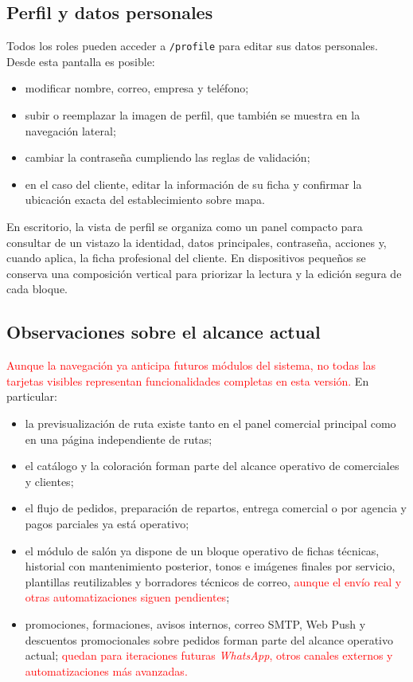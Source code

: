 \subsection{Perfil y datos personales}

Todos los roles pueden acceder a \texttt{/profile} para editar sus datos personales. Desde esta pantalla es posible:

\begin{itemize}
    \item modificar nombre, correo, empresa y teléfono;
    \item subir o reemplazar la imagen de perfil, que también se muestra en la navegación lateral;
    \item cambiar la contraseña cumpliendo las reglas de validación;
    \item en el caso del cliente, editar la información de su ficha y confirmar la ubicación exacta del establecimiento sobre mapa.
\end{itemize}

En escritorio, la vista de perfil se organiza como un panel compacto para consultar de un vistazo la identidad, datos principales, contraseña, acciones y, cuando aplica, la ficha profesional del cliente. En dispositivos pequeños se conserva una composición vertical para priorizar la lectura y la edición segura de cada bloque.

\subsection{Observaciones sobre el alcance actual}

\textcolor{red}{Aunque la navegación ya anticipa futuros módulos del sistema, no todas las tarjetas visibles representan funcionalidades completas en esta versión.} En particular:

\begin{itemize}
    \item la previsualización de ruta existe tanto en el panel comercial principal como en una página independiente de rutas;
    \item el catálogo y la coloración forman parte del alcance operativo de comerciales y clientes;
    \item el flujo de pedidos, preparación de repartos, entrega comercial o por agencia y pagos parciales ya está operativo;
    \item el módulo de salón ya dispone de un bloque operativo de fichas técnicas, historial con mantenimiento posterior, tonos e imágenes finales por servicio, plantillas reutilizables y borradores técnicos de correo, \textcolor{red}{aunque el envío real y otras automatizaciones siguen pendientes};
    \item promociones, formaciones, avisos internos, correo SMTP, Web Push y descuentos promocionales sobre pedidos forman parte del alcance operativo actual; \textcolor{red}{quedan para iteraciones futuras \textit{WhatsApp}, otros canales externos y automatizaciones más avanzadas.}
\end{itemize}
